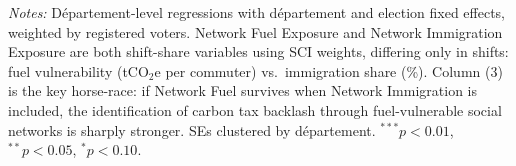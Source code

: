 \begin{table}[htbp]
   \par \raggedright
   \textit{Notes:} D\'{e}partement-level regressions with d\'{e}partement and election fixed effects, weighted by registered voters. Network Fuel Exposure and Network Immigration Exposure are both shift-share variables using SCI weights, differing only in shifts: fuel vulnerability (tCO$_2$e per commuter) vs.\ immigration share (\%). Column (3) is the key horse-race: if Network Fuel survives when Network Immigration is included, the identification of carbon tax backlash through fuel-vulnerable social networks is sharply stronger. SEs clustered by d\'{e}partement. $^{***}p<0.01$, $^{**}p<0.05$, $^{*}p<0.10$.
\end{table}

